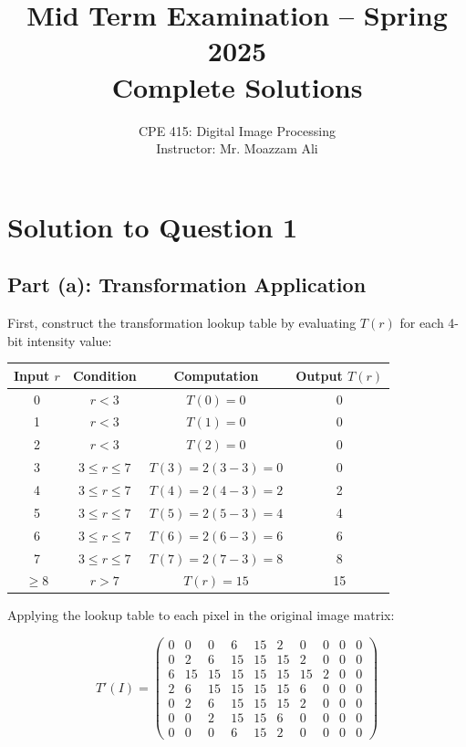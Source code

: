 \documentclass[12pt,a4paper]{article}
\title{\textbf{Mid Term Examination -- Spring 2025} \\ \textbf{Complete Solutions}}
\author{CPE 415: Digital Image Processing \\ Instructor: Mr. Moazzam Ali}
\date{}
\begin{document}
\maketitle

\section*{Solution to Question 1}

\subsection*{Part (a): Transformation Application}

First, construct the transformation lookup table by evaluating $T(r)$ for each 4-bit intensity value:

\begin{center}
\begin{tabular}{|c|c|c|c|}
\hline
\textbf{Input } $r$ & \textbf{Condition} & \textbf{Computation} & \textbf{Output } $T(r)$ \\
\hline
0 & $r < 3$ & $T(0) = 0$ & 0 \\
1 & $r < 3$ & $T(1) = 0$ & 0 \\
2 & $r < 3$ & $T(2) = 0$ & 0 \\
3 & $3 \le r \le 7$ & $T(3) = 2(3 - 3) = 0$ & 0 \\
4 & $3 \le r \le 7$ & $T(4) = 2(4 - 3) = 2$ & 2 \\
5 & $3 \le r \le 7$ & $T(5) = 2(5 - 3) = 4$ & 4 \\
6 & $3 \le r \le 7$ & $T(6) = 2(6 - 3) = 6$ & 6 \\
7 & $3 \le r \le 7$ & $T(7) = 2(7 - 3) = 8$ & 8 \\
$\ge 8$ & $r > 7$ & $T(r) = 15$ & 15 \\
\hline
\end{tabular}
\end{center}

Applying the lookup table to each pixel in the original image matrix:

\begin{equation*}
T'(I) = \begin{pmatrix}
0 & 0 & 0 & 6 & 15 & 2 & 0 & 0 & 0 & 0 \\
0 & 2 & 6 & 15 & 15 & 15 & 2 & 0 & 0 & 0 \\
6 & 15 & 15 & 15 & 15 & 15 & 15 & 2 & 0 & 0 \\
2 & 6 & 15 & 15 & 15 & 15 & 6 & 0 & 0 & 0 \\
0 & 2 & 6 & 15 & 15 & 15 & 2 & 0 & 0 & 0 \\
0 & 0 & 2 & 15 & 15 & 6 & 0 & 0 & 0 & 0 \\
0 & 0 & 0 & 6 & 15 & 2 & 0 & 0 & 0 & 0
\end{pmatrix}
\end{equation*}
\end{document}
